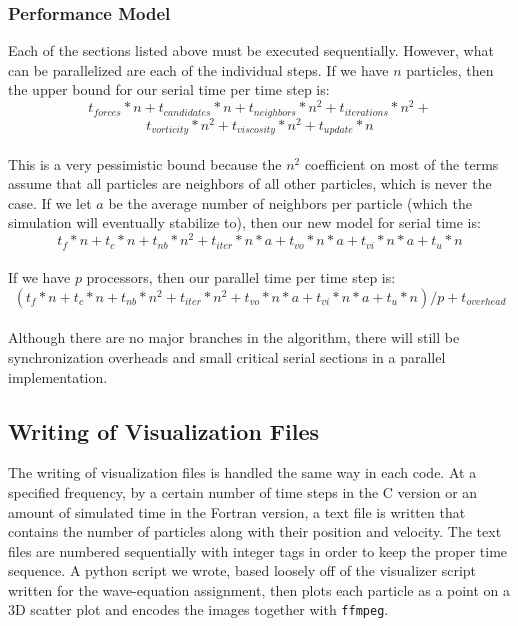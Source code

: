 \documentclass{scrartcl}
\begin{document}
        \subsubsection{Performance Model}
        Each of the sections listed above must be executed sequentially. However, what can be parallelized are each of the individual steps.
        If we have $n$ particles, then the upper bound for our serial time per time step is:
        \\
        $$t_{forces} * n + t_{candidates} * n + t_{neighbors} * n^2 + t_{iterations} * n^2 +$$
        $$t_{vorticity} * n^2 + t_{viscosity} * n^2 + t_{update} * n$$
        \\
        This is a very pessimistic bound because the $n^2$ coefficient on most of the terms assume that all particles are neighbors of all other particles, which is never the case. If we let $a$ be the average number of neighbors per particle (which the simulation will eventually stabilize to), then our new model for serial time is:
        \\
        $$t_{f} * n + t_{c} * n + t_{nb} * n^2 + t_{iter} * n * a + t_{vo} * n * a + t_{vi} * n * a + t_{u} * n$$
        \\
        If we have $p$ processors, then our parallel time per time step is:
        \\
        $$(t_{f} * n + t_{c} * n + t_{nb} * n^2 + t_{iter} * n^2 + t_{vo} * n * a + t_{vi} * n * a + t_{u} * n) / p + t_{overhead}$$
        \\
        Although there are no major branches in the algorithm, there will still be synchronization overheads and small critical serial sections in a parallel implementation.
    
    \subsection{Writing of Visualization Files}
    The writing of visualization files is handled the same way in each code. At a specified frequency, by a certain number of time steps in the C version or an amount of simulated time in the Fortran version, a text file is written that contains the number of particles along with their position and velocity. The text files are numbered sequentially with integer tags in order to keep the proper time sequence. A python script we wrote, based loosely off of the visualizer script written for the wave-equation assignment, then plots each particle as a point on a 3D scatter plot and encodes the images together with \texttt{ffmpeg}.
\end{document}
